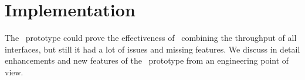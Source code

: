 \chapter{Implementation} %
\label{ch:implementation} %


The \protoold~prototype could prove the effectiveness of \mhttp~combining the throughput of all interfaces, but still it had a lot of issues and missing features. 
We discuss in detail enhancements and new features of the \protonew~prototype from an engineering point of view. 
